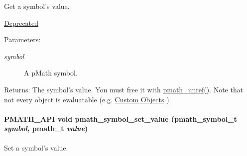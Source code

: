 Get a symbol's value. 

\begin{Desc}
\item[\hyperlink{deprecated__deprecated000001}{Deprecated}]\end{Desc}
\begin{Desc}
\item[Parameters:]
\begin{description}
\item[{\em symbol}]A pMath symbol. \end{description}
\end{Desc}
\begin{Desc}
\item[Returns:]The symbol's value. You must free it with \hyperlink{classpmath__t_54e905402c38940687033b87eb8c6c9f}{pmath\_\-unref()}. Note that not every object is evaluatable (e.g. \hyperlink{group__custom}{Custom Objects} ). \end{Desc}
\hypertarget{group__symbols_g8344005c16b86be82d2efdedb0795a0c}{
\paragraph[{pmath\_\-symbol\_\-set\_\-value}]{\setlength{\rightskip}{0pt plus 5cm}PMATH\_\-API void pmath\_\-symbol\_\-set\_\-value ({\bf pmath\_\-symbol\_\-t} {\em symbol}, \/  {\bf pmath\_\-t} {\em value})}\hfill}
\label{group__symbols_g8344005c16b86be82d2efdedb0795a0c}


Set a symbol's value. 

